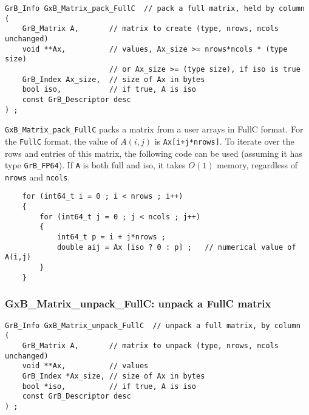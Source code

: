 \documentclass[12pt]{article}
\begin{document}
\begin{mdframed}[userdefinedwidth=6in]
{\footnotesize
\begin{verbatim}
GrB_Info GxB_Matrix_pack_FullC  // pack a full matrix, held by column
(
    GrB_Matrix A,       // matrix to create (type, nrows, ncols unchanged)
    void **Ax,          // values, Ax_size >= nrows*ncols * (type size)
                        // or Ax_size >= (type size), if iso is true
    GrB_Index Ax_size,  // size of Ax in bytes
    bool iso,           // if true, A is iso
    const GrB_Descriptor desc
) ;
\end{verbatim}
} \end{mdframed}

\verb'GxB_Matrix_pack_FullC' packs a matrix from a user arrays in FullC
format.  For the \verb'FullC' format,
the value of $A(i,j)$ is \verb'Ax[i+j*nrows]'.
To iterate over the rows and entries of this matrix, the following code can be
used (assuming it has type \verb'GrB_FP64').
If \verb'A' is both full and iso, it takes $O(1)$ memory,
regardless of \verb'nrows' and \verb'ncols'.

    \vspace{-0.1in}
    {\footnotesize
    \begin{verbatim}
    for (int64_t i = 0 ; i < nrows ; i++)
    {
        for (int64_t j = 0 ; j < ncols ; j++)
        {
            int64_t p = i + j*nrows ;
            double aij = Ax [iso ? 0 : p] ;   // numerical value of A(i,j)
        }
    } \end{verbatim}}

\subsubsection{{\sf GxB\_Matrix\_unpack\_FullC:} unpack a FullC matrix}
\label{matrix_unpack_fullc}

\begin{mdframed}[userdefinedwidth=6in]
{\footnotesize
\begin{verbatim}
GrB_Info GxB_Matrix_unpack_FullC  // unpack a full matrix, by column
(
    GrB_Matrix A,       // matrix to unpack (type, nrows, ncols unchanged)
    void **Ax,          // values
    GrB_Index *Ax_size, // size of Ax in bytes
    bool *iso,          // if true, A is iso
    const GrB_Descriptor desc
) ;
\end{verbatim}
} \end{mdframed}
\end{document}
